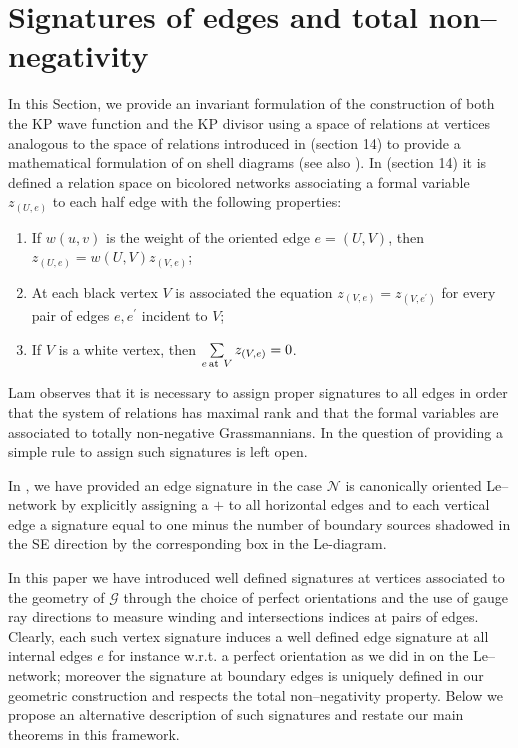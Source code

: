 \documentclass[11pt]{amsart}
\theoremstyle{plain}
\numberwithin{equation}{section}
\begin{document}
\section{Signatures of edges and total non--negativity}\label{sec:lam1}
In this Section, we provide an invariant formulation of the construction of both the KP wave function and the KP divisor using a space of relations at vertices analogous to the space of relations introduced in \cite{Lam2} (section 14) to provide a mathematical formulation of on shell diagrams \cite{AGP1, AGP2} (see also \cite{ATT}).
In \cite{Lam2} (section 14) it is defined a relation space on bicolored networks associating a formal variable $z_{(U,e)}$ to each half edge with the following properties:
\begin{enumerate}
\item If $w(u,v)$ is the weight of the oriented edge $e=(U,V)$, then $ z_{(U,e)} = w(U,V) z_{(V,e)}$;
\item At each black vertex $V$ is associated the equation $z_{(V,e)} = z_{(V,e^{\prime})}$ for every pair of edges $e,e^{\prime}$ incident to $V$;
\item If $V$ is a white vertex, then $\sum\limits_{e\,\mbox{\scriptsize{at}}\ V} z_{(V,e)} = 0$.
\end{enumerate}
Lam \cite{Lam2} observes that it is necessary to assign proper signatures to all edges in order that the system of relations has maximal rank and that the formal variables are associated to totally non-negative Grassmannians. In \cite{Lam2} the question of providing a simple rule to assign such signatures is left open.  

In \cite{AG2}, we have provided an edge signature in the case $\mathcal N$ is canonically oriented Le--network by explicitly assigning a $+$ to all horizontal edges and to each vertical edge a signature equal to one minus the number of boundary sources shadowed in the SE direction by the corresponding box in the Le-diagram. 

In this paper we have introduced well defined signatures at vertices associated to the geometry of $\mathcal G$ through the choice of perfect orientations and the use of gauge ray directions to measure winding and intersections indices at pairs of edges. Clearly, each such vertex signature induces a well defined edge signature at all internal edges $e$ for instance w.r.t. a perfect orientation as we did in \cite{AG2} on the Le--network; moreover the signature at boundary edges is uniquely defined in our geometric construction and respects the total non--negativity property. Below we propose an alternative description of such signatures and restate our main theorems in this framework.
\end{document}
